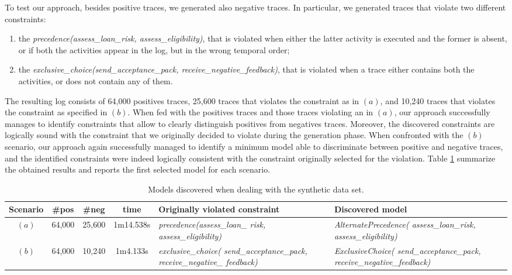 To test our approach, besides positive traces, we generated also negative traces. In particular, we generated traces that violate two different constraints:
\begin{enumerate}[label=(\alph*)]
\item the \emph{precedence(assess\_loan\_risk, assess\_eligibility)}, that is violated when either the latter activity is executed and the former is absent, or if both the activities appear in the log, but in the wrong temporal order;
%
\item the \emph{exclusive\_choice(send\_acceptance\_pack, receive\_negative\_feedback)}, that is violated when a trace either contains both the activities, or does not contain any of them.
\end{enumerate}
%
The resulting log consists of 64,000 positives traces, 25,600 traces that violates the constraint as in $(a)$, and 10,240 traces that violates the constraint as specified in $(b)$.
%
When fed with the positives traces and those traces violating an in $(a)$, our approach successfully manages to identify constraints that allow to clearly distinguish positives from negatives traces. Moreover, the discovered constraints are logically sound with the constraint that we originally decided to violate during the generation phase. When confronted with the $(b)$ scenario, our approach again successfully managed to identify a minimum model able to discriminate between positive and negative traces, and the identified constraints were indeed logically consistent with the constraint originally selected for the violation. Table \ref{tab:syntResults} summarize the obtained results and reports the first selected model for each scenario.

\begin{table}
\begin{footnotesize}
\begin{tabular}{c c c c p{3cm} | p{3cm}}
\hline
Scenario & \#pos & \#neg & time & Originally violated constraint & Discovered model \\
\hline\hline
$(a)$ & 64,000 & 25,600 & 1m14.538s & \emph{precedence(assess\_loan\_ risk, assess\_eligibility)} & \emph{AlternatePrecedence( assess\_loan\_risk, assess\_eligibility)}\\
%
\hline
%
$(b)$ & 64,000 & 10,240 & 1m4.133s & \emph{exclusive\_choice( send\_acceptance\_pack, receive\_negative\_ feedback)} & \emph{ExclusiveChoice( send\_acceptance\_pack, receive\_negative\_feedback)}\\
\hline
\end{tabular}
\end{footnotesize}
\caption{Models discovered when dealing with the synthetic data set.}
\label{tab:syntResults}
\end{table}


